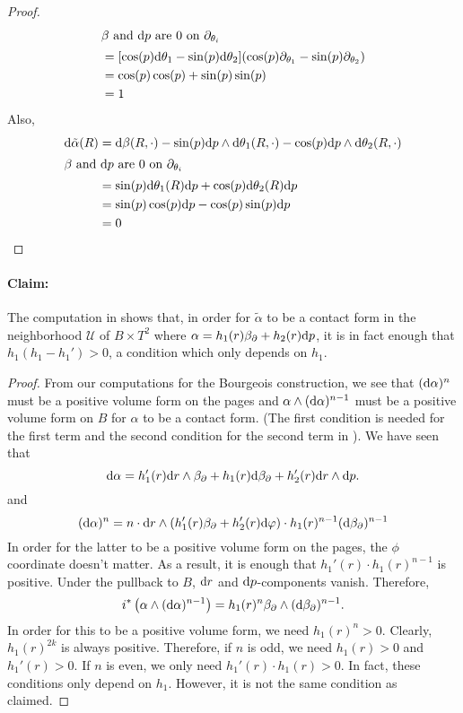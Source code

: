 \begin{proof}
\begin{align*}
        \intertext{$\beta$ and $\mathrm{d} p$ are 0 on $\partial_{\theta_i}$}
        &= [\cos(p) \mathrm{d} \theta_1 - \sin(p) \mathrm{d} \theta_2](\cos(p)\partial_{\theta_1} - \sin(p)\partial_{\theta_2})\\
        &= \cos(p)\cos(p) + \sin(p)\sin(p)\\
        &= 1
    \end{align*}
    Also,
    \begin{align*}
        \mathrm{d} \tilde\alpha(R) &= \mathrm{d} \beta(R, \cdot) - \sin(p)\mathrm{d} p \wedge \mathrm{d}\theta_1(R, \cdot) - \cos(p)\mathrm{d} p \wedge \mathrm{d} \theta_2(R, \cdot)\\
        \intertext{$\beta$ and $\mathrm{d} p$ are 0 on $\partial_{\theta_i}$}
        &= \sin(p)\mathrm{d} \theta_1(R) \mathrm{d} p + \cos(p)\mathrm{d}\theta_2(R)\mathrm{d} p\\
        &= \sin(p)\cos(p) \mathrm{d} p - \cos(p)\sin(p)\mathrm{d} p\\
        &= 0
    \end{align*}
\end{proof}
\paragraph*{Claim:}
The computation in \cite{Bourgeois02}
shows that, in order for $\tilde \alpha$ to be a contact form in the neighborhood $\mathcal{U}$ of $B \times T^2$ where 
$\alpha = h_1(r) \beta_\partial + h_2(r) \mathrm{d} p$, it is in fact enough that $h_1(h_1 - h_1') > 0$, a condition which only depends on $h_1$.
\begin{proof}
    From our computations for the Bourgeois construction, we see that $(\mathrm{d} \alpha)^n$ must be a positive volume form on the pages and
    $\alpha \wedge (\mathrm{d} \alpha)^{n-1}$ must be a positive volume form on $B$ for $\alpha$ to be a contact form. (The first condition is needed for the first term and the second condition for the second term in \cite[Equation (6)]{Bourgeois02}).
    We have seen that
    \[
        \mathrm{d} \alpha = h_1'(r)\mathrm{d} r\wedge \beta_\partial + h_1(r) \mathrm{d} \beta_\partial + h_2'(r) \mathrm{d} r \wedge \mathrm{d} p.
    \]
    and 
    \[
        (\mathrm{d} \alpha)^n = n\cdot \mathrm{d} r\wedge (h_1'(r) \beta_\partial + h_2'(r) \mathrm{d}\varphi) \cdot h_1(r)^{n-1}(\mathrm{d} \beta_\partial)^{n-1}
    \]
    In order for the latter to be a positive volume form on the pages, the $\phi$ coordinate doesn't matter. As a result, it is enough that $h_1'(r) \cdot h_1(r)^{n-1}$ is positive.
    Under the pullback to $B$, $\mathrm{d} r$ and $\mathrm{d} p$-components vanish. Therefore,
    \[
        i^*\left(\alpha \wedge (\mathrm{d} \alpha)^{n-1}\right) = h_1(r)^n\beta_\partial \wedge (\mathrm{d} \beta_\partial)^{n-1}. 
    \]
    In order for this to be a positive volume form, we need $h_1(r)^n > 0$.
    Clearly, $h_1(r)^{2k}$ is always positive. Therefore, if $n$ is odd, we need
    $h_1(r) > 0$ and $h_1'(r) > 0$. If $n$ is even, we only need $h_1'(r)\cdot h_1(r) > 0$.
    In fact, these conditions only depend on $h_1$. However, it is not the same condition as claimed.
\end{proof}


